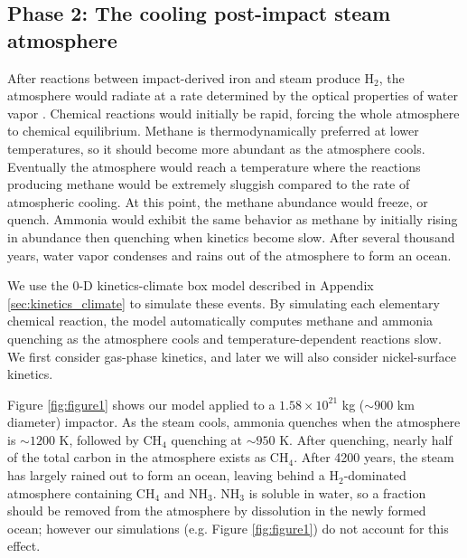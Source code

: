 \subsection{Phase 2: The cooling post-impact steam atmosphere} \label{sec:phase2}

After reactions between impact-derived iron and steam produce H$_2$, the atmosphere would radiate at a rate determined by the optical properties of water vapor \citep{Zahnle_2020}. Chemical reactions would initially be rapid, forcing the whole atmosphere to chemical equilibrium. Methane is thermodynamically preferred at lower temperatures, so it should become more abundant as the atmosphere cools. Eventually the atmosphere would reach a temperature where the reactions producing methane would be extremely sluggish compared to the rate of atmospheric cooling. At this point, the methane abundance would freeze, or quench. Ammonia would exhibit the same behavior as methane by initially rising in abundance then quenching when kinetics become slow. After several thousand years, water vapor condenses and rains out of the atmosphere to form an ocean.

We use the 0-D kinetics-climate box model described in Appendix \ref{sec:kinetics_climate} to simulate these events. By simulating each elementary chemical reaction, the model automatically computes methane and ammonia quenching as the atmosphere cools and temperature-dependent reactions slow. We first consider gas-phase kinetics, and later we will also consider nickel-surface kinetics.

Figure \ref{fig:figure1} shows our model applied to a $1.58 \times 10^{21}$ kg ($\sim 900$ km diameter) impactor. As the steam cools, ammonia quenches when the atmosphere is $\sim 1200$ K, followed by CH$_4$ quenching at $\sim 950$ K. After quenching, nearly half of the total carbon in the atmosphere exists as CH$_4$. After 4200 years, the steam has largely rained out to form an ocean, leaving behind a H$_2$-dominated atmosphere containing CH$_4$ and NH$_3$. NH$_3$ is soluble in water, so a fraction should be removed from the atmosphere by dissolution in the newly formed ocean; however our simulations (e.g. Figure \ref{fig:figure1}) do not account for this effect. 


